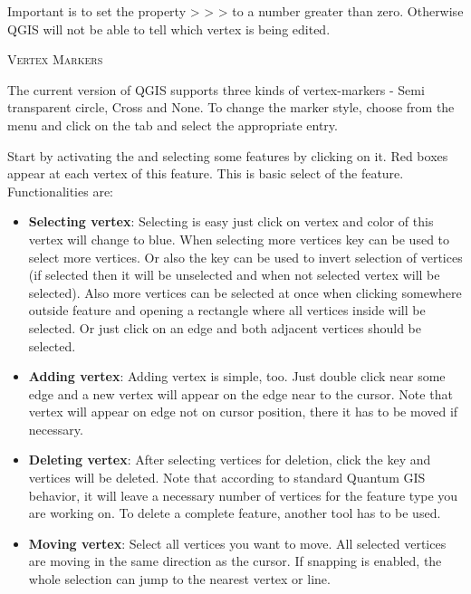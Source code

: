 Important is to set the property  >
 >
> to a number greater than
zero. Otherwise QGIS will not be able to tell which vertex is being edited.

\begin{Tip}\caption{\textsc{Vertex Markers}}
The current version of QGIS supports three kinds of vertex-markers -
Semi transparent circle, Cross and None. To change the marker style, choose
 from the  menu
and click on the  tab and select the appropriate entry.
\end{Tip}


Start by activating the  and selecting
some features by clicking on it. Red boxes appear at each vertex of this feature.
This is basic select of the feature. Functionalities are:

\begin{itemize}[label=--]
\item \textbf{Selecting vertex}: Selecting is easy just click on vertex and
color of this vertex will change to blue. When selecting more vertices
 key can be used to select more vertices. Or also the
 key can be used to invert selection of vertices (if selected then
it will be unselected and when not selected vertex will be selected). Also more
vertices can be selected at once when clicking somewhere outside feature and opening a rectangle where all vertices inside will be selected. Or just click on an edge and
both adjacent vertices should be selected.
\item \textbf{Adding vertex}: Adding vertex is simple, too. Just double click near
some edge and a new vertex will appear on the edge near to the cursor. Note that
vertex will appear on edge not on cursor position, there it has to be moved if
necessary.
\item \textbf{Deleting vertex}: After selecting vertices for deletion, click the
 key and vertices will be deleted. Note that according to
standard Quantum GIS behavior, it will leave a necessary number of vertices for
the feature type you are working on. To delete a complete feature, another tool
has to be used.
\item \textbf{Moving vertex}: Select all vertices you want to move. All selected
vertices are moving in the same direction as the cursor. If snapping is enabled,
the whole selection can jump to the nearest vertex or line.
\end{itemize}

